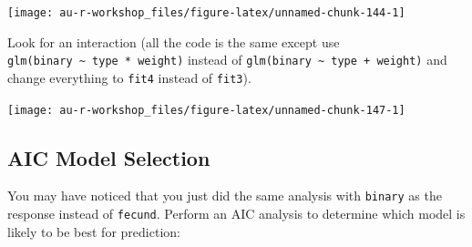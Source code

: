\documentclass[]{book}
\newenvironment{Shaded}{\begin{snugshade}}{\end{snugshade}}
\newcommand{\KeywordTok}[1]{\textcolor[rgb]{0.13,0.29,0.53}{\textbf{#1}}}
\newcommand{\DataTypeTok}[1]{\textcolor[rgb]{0.13,0.29,0.53}{#1}}
\newcommand{\DecValTok}[1]{\textcolor[rgb]{0.00,0.00,0.81}{#1}}
\newcommand{\StringTok}[1]{\textcolor[rgb]{0.31,0.60,0.02}{#1}}
\newcommand{\OperatorTok}[1]{\textcolor[rgb]{0.81,0.36,0.00}{\textbf{#1}}}
\newcommand{\NormalTok}[1]{#1}
\theoremstyle{definition}
\theoremstyle{definition}
\theoremstyle{definition}
\theoremstyle{remark}
\begin{document}
\begin{center}\texttt{[image: au-r-workshop\_files/figure-latex/unnamed-chunk-144-1]} \end{center}

Look for an interaction (all the code is the same except use
\texttt{glm(binary\ \textasciitilde{}\ type\ *\ weight)} instead of
\texttt{glm(binary\ \textasciitilde{}\ type\ +\ weight)} and change
everything to \texttt{fit4} instead of \texttt{fit3}).

\begin{Shaded}
\end{Shaded}

\begin{center}\texttt{[image: au-r-workshop\_files/figure-latex/unnamed-chunk-147-1]} \end{center}

\subsection{AIC Model Selection}\label{aic-model-selection-1}

You may have noticed that you just did the same analysis with
\texttt{binary} as the response instead of \texttt{fecund}. Perform an
AIC analysis to determine which model is likely to be best for
prediction:
\end{document}
